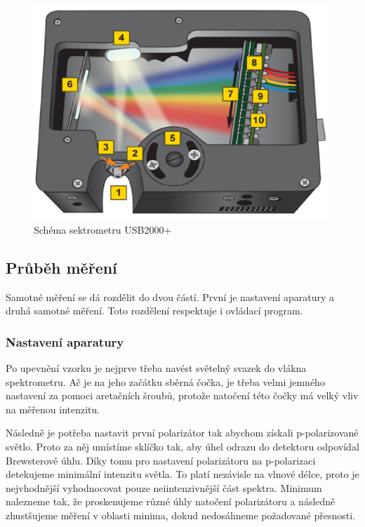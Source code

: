 \begin{figure}
    \begin{center}
    \includegraphics[width=5in]{img/usb4openbench.eps}
    \end{center}
    \caption{Schéma sektrometru USB2000+}
    \label{USB2000+ schema}
\end{figure}

\subsection{Průběh měření}
Samotné měření se dá rozdělit do dvou částí. První je nastavení aparatury a druhá samotné měření. Toto rozdělení respektuje i ovládací program.
\subsubsection{Nastavení aparatury}
Po upevnění vzorku je nejprve třeba navést světelný svazek do vlákna spektrometru. Ač je na jeho začátku sběrná čočka, je třeba velmi jemného nastavení za pomoci aretačních šroubů, protože natočení této čočky má velký vliv na měřenou intenzitu.

Následně je potřeba nastavit první polarizátor tak abychom získali p-polarizované světlo. Proto za něj umístíme sklíčko tak, aby úhel odrazu do detektoru odpovídal Brewsterově úhlu. Díky tomu pro nastavení polarizátoru na p-polarizaci detekujeme minimální intenzitu světla. To platí nezávisle na vlnové délce, proto je nejvhodnější vyhodnocovat pouze neiintenzivnější část spektra. Minimum nalezneme tak, že proskenujeme různé úhly natočení polarizátoru a následně zhustšujeme měření v oblasti minima, dokud nedosáhneme požadované přesnosti.

